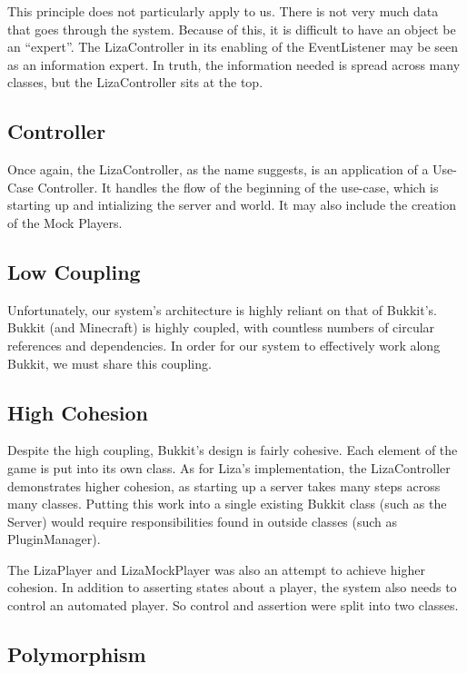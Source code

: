 \documentclass{article}
\begin{document}
	This principle does not particularly apply to us. There is not very much data
	that goes through the system. Because of this, it is difficult to have an
	object be an ``expert''. The LizaController in its enabling of the EventListener
	may be seen as an information expert. In truth, the information needed
	is spread across many classes, but the LizaController sits at the top.

	\subsection{Controller}

	Once again, the LizaController, as the name suggests, is an application
	of a Use-Case Controller. It handles the flow of the beginning of the
	use-case, which is starting up and intializing the server and world. It
	may also include the creation of the Mock Players.

	\subsection{Low Coupling}

	Unfortunately, our system's architecture is highly reliant on that
	of Bukkit's. Bukkit (and Minecraft) is highly coupled, with countless
	numbers of circular references and dependencies. In order for our
	system to effectively work along Bukkit, we must share this coupling.

	\subsection{High Cohesion}

	Despite the high coupling, Bukkit's design is fairly cohesive. Each
	element of the game is put into its own class. As for Liza's implementation,
	the LizaController demonstrates higher cohesion, as
	starting up a server takes many steps across many classes. Putting this
	work into a single existing Bukkit class (such as the Server) would require
	responsibilities found in outside classes (such as PluginManager).

	The LizaPlayer and LizaMockPlayer was also an attempt to achieve higher
	cohesion. In addition to asserting states about a player, the system
	also needs to control an automated player. So control and assertion
	were split into two classes.

	\subsection{Polymorphism}
\end{document}
